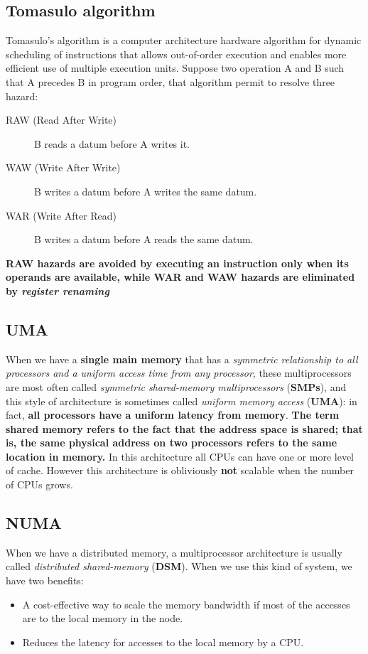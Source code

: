 \documentclass[10pt,a4paper]{article}
\begin{document}
\subsection{Tomasulo algorithm}

Tomasulo’s algorithm is a computer architecture hardware algorithm for dynamic scheduling of instructions that allows out-of-order execution and enables more efficient use of multiple execution units. Suppose two operation A and B such that A precedes B in program order, that algorithm permit to resolve three hazard:

\begin{description}
\item[RAW (Read After Write)] B reads a datum before A writes it.
\item[WAW (Write After Write)] B writes a datum before A writes the same datum.

\item[WAR (Write After Read)] B writes a datum before A reads the same datum.
\end{description}

\textbf{RAW hazards are avoided by executing an instruction only when its operands are available, while WAR and WAW hazards are eliminated by \textit{register renaming}}

\subsection{UMA}

When we have a \textbf{single main memory} that has a \textit{symmetric relationship to all processors and a uniform access time from any processor}, these multiprocessors are most often called \textit{symmetric shared-memory multiprocessors} (\textbf{SMPs}), and this style of architecture is sometimes called \textit{uniform memory access} (\textbf{UMA}): in fact, \textbf{all processors have a uniform latency from memory}. \textbf{The term shared memory refers to the fact that the address space is shared; that is, the same physical address on two processors refers to the same location in memory.} In this architecture all CPUs can have one or more level of cache. However this architecture is obliviously \textbf{not} scalable when the number of CPUs grows.

\subsection{NUMA}

When we have a distributed memory, a multiprocessor architecture is usually called \textit{distributed shared-memory} (\textbf{DSM}). When we use this kind of system, we have two benefits:
\begin{itemize}
\item A cost-effective way to scale the memory bandwidth if most of the accesses are to the local memory in the node.
\item Reduces the latency for accesses to the local memory by a CPU.
\end{itemize}
\end{document}
